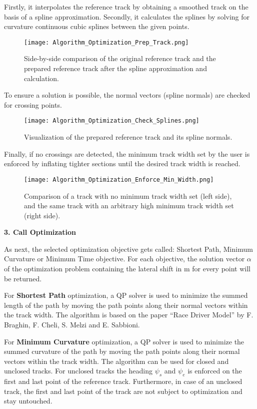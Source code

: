 Firstly, it interpolates the reference track by obtaining a smoothed track on the basis of a spline approximation. Secondly, it calculates the splines by solving for curvature continuous cubic splines between the given points.
\begin{figure}[H]
    \centering
    \texttt{[image: Algorithm\_Optimization\_Prep\_Track.png]}
    \caption{Side-by-side comparison of the original reference track and the prepared reference track after the spline approximation and calculation.}
    \label{fig:Optimization Algorithm Prepare Track}
\end{figure}
To ensure a solution is possible, the normal vectors (spline normals) are checked for crossing points.
\begin{figure}[H]
    \centering
    \texttt{[image: Algorithm\_Optimization\_Check\_Splines.png]}
    \caption{Visualization of the prepared reference track and its spline normals.}
    \label{fig:Optimization Algorithm Check Spline Normals for Crossing Points}
\end{figure}
Finally, if no crossings are detected, the minimum track width set by the user is enforced by inflating tighter sections until the desired track width is reached.
\begin{figure}[H]
    \centering
    \texttt{[image: Algorithm\_Optimization\_Enforce\_Min\_Width.png]}
    \caption{Comparison of a track with no minimum track width set (left side), and the same track with an arbitrary high minimum track width set (right side).}
    \label{fig:Optimization Algorithm Check Spline Normals for Crossing Points}
\end{figure}

\textbf{3. Call Optimization}

As next, the selected optimization objective gets called: Shortest Path, Minimum Curvature or Minimum Time objective. For each objective, the solution vector $\alpha$ of the optimization problem containing the lateral shift in m for every point will be returned.

For \textbf{Shortest Path} optimization, a QP solver is used to minimize the summed length of the path by moving the path points along their normal vectors within the track width. The algorithm is based on the paper ``Race Driver Model'' by F. Braghin, F. Cheli, S. Melzi and E. Sabbioni. %

For \textbf{Minimum Curvature} optimization, a QP solver is used to minimize the summed curvature of the path by moving the path points along their normal vectors within the track width. The algorithm can be used for closed and unclosed tracks. For unclosed tracks the heading $\psi_s$ and $\psi_e$ is enforced on the first and last point of the reference track. Furthermore, in case of an unclosed track, the first and last point of the track are not subject to optimization and stay untouched. %

